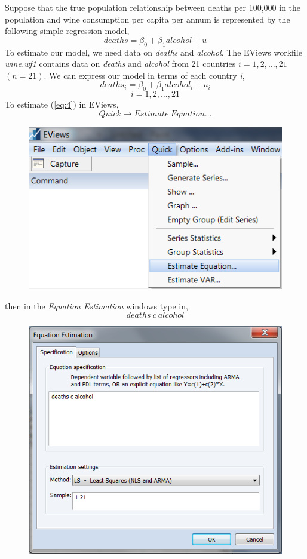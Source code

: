 \documentclass[12pt]{report}
\begin{document}
		
		\noindent Suppose that the true population relationship between deaths per 100,000 in the population and wine consumption per capita per annum is represented by the following simple regression model,
		\begin{equation}
			deaths = \beta_0 + \beta_1alcohol + u \label{eq:3}
		\end{equation}
		To estimate our model, we need data on \textit{deaths} and \textit{alcohol}. The EViews workfile \textit{wine.wf1} contains data on \textit{deaths} and \textit{alcohol} from 21 countries $i = 1, 2, \dots, 21$ $(n=21)$. We can express our model in terms of each country \textit{i},
		\begin{equation}
			deaths_i = \beta_0 + \beta_1alcohol_i + u_i \label{eq:4}
		\end{equation}
		$$i = 1, 2, \dots, 21$$
		To estimate (\ref{eq:4}) in EViews,
		$$Quick \to Estimate\ Equation\dots$$
		\begin{figure}[H]
			\centering
			\includegraphics{esteqn}
		\end{figure}
		\vspace{-\baselineskip}
		\noindent then in the \textit{Equation Estimation} windows type in,
		$$deaths\ c\ alcohol$$
		\begin{figure}[H]
			\centering
			\includegraphics{esteqn1}
		\end{figure}
\end{document}
